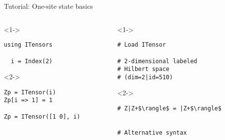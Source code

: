 \begin{frame}[fragile]{Tutorial: One-site state basics}

\begin{columns}

\begin{column}{4.5cm}

\begin{onlyenv}<1->

  \begin{lstlisting}[language=JuliaLocal, style=julia, basicstyle=\small]
  using ITensors

  i = Index(2)

  \end{lstlisting}

\end{onlyenv}

\begin{onlyenv}<2->

\begin{lstlisting}[language=JuliaLocal, style=julia, basicstyle=\small]
Zp = ITensor(i)
Zp[i => 1] = 1

Zp = ITensor([1 0], i)
\end{lstlisting}

\end{onlyenv}

\end{column}

\begin{column}{4.5cm}

\begin{onlyenv}<1->

\begin{lstlisting}[style=julia, numbers=none, mathescape, basicstyle=\small]
# Load ITensor

# 2-dimensional labeled
# Hilbert space
# (dim=2|id=510)
\end{lstlisting}

\end{onlyenv}

\begin{onlyenv}<2->

\begin{lstlisting}[style=julia, numbers=none, mathescape, basicstyle=\small]
# Z|Z+$\rangle$ = |Z+$\rangle$


# Alternative syntax
\end{lstlisting}

\end{onlyenv}

\end{column}

\end{columns}

\end{frame}
